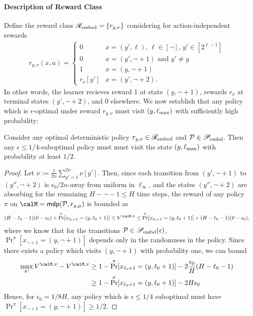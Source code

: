 
\paragraph{Description of Reward Class}
Define the reward class $\mathscr{R}_{\mathrm{embed}} = \{r_{y,\nu}\}$ considering for action-independent rewards
\begin{align*}
r_{y,\nu}(x,a) = \begin{cases} 0 & x = (y',\ell),\, \ell \in [\lnot], \, y' \in [2^{\ell - 1}]\\
0 & x = (y',\lnot + 1) \text{ and } y' \ne y\\
1 & x = (y,\lnot + 1)  \\
r_{\nu}[y'] & x = (y',\lnot + 2).
\end{cases}
\end{align*}
In other words, the learner recieves reward $1$ at state $(y,\lnot+1)$, rewards $r_{\nu}$ at terminal states $(y',\lnot + 2)$, and $0$ elsewhere. We now establish that any policy which is $\epsilon$-optimal under reward $r_{y,\nu}$ must visit $(y,\ell_{\max})$ with sufficiently high probability:
\newcommand{\nubar}{\overline{\nu}}
\begin{lemma}\label{lem:visit_y} Consider any optimal deterministic policy 
$r_{y,\nu} \in \mathscr{R}_{\mathrm{embed}}$ and $\mathcal{P} \in \mathscr{P}_{\mathrm{embd}}$. Then any $\epsilon \le 1/4$-suboptimal policy must must visit the state $(y,\ell_{\max})$ with probability at least $1/2$.
\end{lemma}
\begin{proof}
Let $\nubar := \frac{1}{2n}\sum_{y'=1}^{2n}\nu[y']$. Then, since each transition from $(y',\lnot+1)$ to $(y'',\lnot+2)$ is $\epsilon_0/2n$-away from uniform in $\ell_{\infty}$, and the states $(y'',\lnot+2)$ are absorbing for the remaining $H - \lnot - 1 \le H$ time steps, the reward of any policy $\pi$ on $\calM = \mdp(\calP,r_{y,\mu})$ is bounded as
\begin{multline*}
(H - \lnot - 1) (\nubar - \epsilon_0) + \Pr^{\pi}[x_{\lnot+1} =  (y,\lnot + 1)] \le V^{\calM,\pi} 
\le  \Pr^{\pi}[x_{\lnot+1} =  (y,\lnot + 1)] + (H - \lnot - 1) (\nubar - \epsilon_0),
\end{multline*}
where we know that for the transitions $\mathcal{P} \in \mathscr{P}_{\mathrm{embd}}(\epsilon)$, $\Pr^{\pi}[x_{\lnot+1} =  (y,\lnot + 1)]$ depends only in the randomness in the policy. Since there exists a  policy which visits $(y,\lnot+1)$ with probability one, we can bound
\begin{align*}
 \max_{\pi'} V^{\calM,\pi} - V^{\calM,\pi} &\ge 1 - \Pr^{\pi}[x_{\lnot+1} =  (y,\lnot + 1)] - 2\frac{\epsilon_0}{H} (H - \lnot - 1)\\
 &\ge 1- \Pr^{\pi}[x_{\lnot+1} = (y,\lnot + 1)] - 2H\epsilon_0
\end{align*}
Hence, for $\epsilon_0 = 1/8H$, any policy which is $\epsilon \le 1/4$ suboptimal must have $\Pr^{\pi}[x_{\lnot+1} = (y,\lnot + 1)] \ge 1/2$.
\end{proof}


